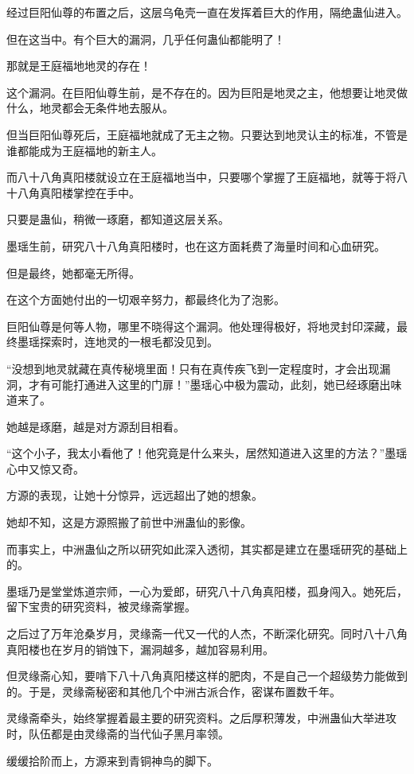 \begin{this_body}
经过巨阳仙尊的布置之后，这层乌龟壳一直在发挥着巨大的作用，隔绝蛊仙进入。

但在这当中。有个巨大的漏洞，几乎任何蛊仙都能明了！

那就是王庭福地地灵的存在！

这个漏洞。在巨阳仙尊生前，是不存在的。因为巨阳是地灵之主，他想要让地灵做什么，地灵都会无条件地去服从。

但当巨阳仙尊死后，王庭福地就成了无主之物。只要达到地灵认主的标准，不管是谁都能成为王庭福地的新主人。

而八十八角真阳楼就设立在王庭福地当中，只要哪个掌握了王庭福地，就等于将八十八角真阳楼掌控在手中。

只要是蛊仙，稍微一琢磨，都知道这层关系。

墨瑶生前，研究八十八角真阳楼时，也在这方面耗费了海量时间和心血研究。

但是最终，她都毫无所得。

在这个方面她付出的一切艰辛努力，都最终化为了泡影。

巨阳仙尊是何等人物，哪里不晓得这个漏洞。他处理得极好，将地灵封印深藏，最终墨瑶探索时，连地灵的一根毛都没见到。

“没想到地灵就藏在真传秘境里面！只有在真传疾飞到一定程度时，才会出现漏洞，才有可能打通进入这里的门扉！”墨瑶心中极为震动，此刻，她已经琢磨出味道来了。

她越是琢磨，越是对方源刮目相看。

“这个小子，我太小看他了！他究竟是什么来头，居然知道进入这里的方法？”墨瑶心中又惊又奇。

方源的表现，让她十分惊异，远远超出了她的想象。

她却不知，这是方源照搬了前世中洲蛊仙的影像。

而事实上，中洲蛊仙之所以研究如此深入透彻，其实都是建立在墨瑶研究的基础上的。

墨瑶乃是堂堂炼道宗师，一心为爱郎，研究八十八角真阳楼，孤身闯入。她死后，留下宝贵的研究资料，被灵缘斋掌握。

之后过了万年沧桑岁月，灵缘斋一代又一代的人杰，不断深化研究。同时八十八角真阳楼也在岁月的销蚀下，漏洞越多，越加容易利用。

但灵缘斋心知，要啃下八十八角真阳楼这样的肥肉，不是自己一个超级势力能做到的。于是，灵缘斋秘密和其他几个中洲古派合作，密谋布置数千年。

灵缘斋牵头，始终掌握着最主要的研究资料。之后厚积薄发，中洲蛊仙大举进攻时，队伍都是由灵缘斋的当代仙子黑月率领。

缓缓拾阶而上，方源来到青铜神鸟的脚下。


\end{this_body}
